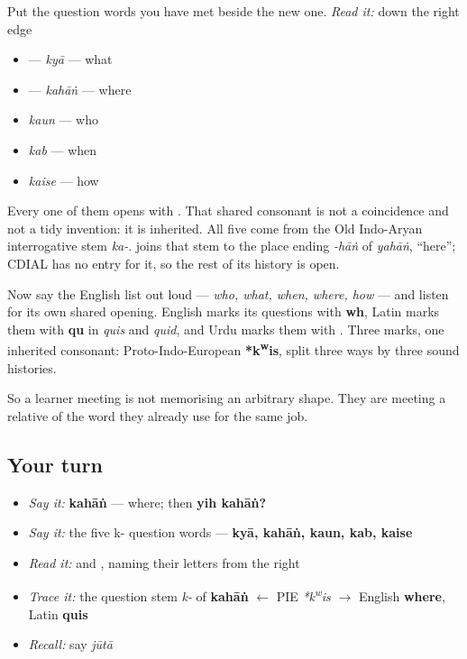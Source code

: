 \begin{cousinweb}
Put the question words you have met beside the new one. \emph{Read it:} down the right edge

\begin{itemize}
\raggedright
  \item \textbf{} — \emph{kyā} — what
  \item \textbf{} — \emph{kahāṅ} — where
  \item \emph{kaun} — who
  \item \emph{kab} — when
  \item \emph{kaise} — how
\end{itemize}

Every one of them opens with \textbf{}. That shared consonant is not a coincidence and not a tidy invention: it is inherited. All five come from the Old Indo-Aryan interrogative stem \emph{ka-}. \textbf{} joins that stem to the place ending \emph{-hāṅ} of \emph{yahāṅ}, \textquotedblleft{}here\textquotedblright{}; CDIAL has no entry for it, so the rest of its history is open.

Now say the English list out loud — \emph{who, what, when, where, how} — and listen for its own shared opening. English marks its questions with \textbf{wh}, Latin marks them with \textbf{qu} in \emph{quis} and \emph{quid}, and Urdu marks them with \textbf{}. Three marks, one inherited consonant: Proto-Indo-European \textbf{*k\textsuperscript{w}is}, split three ways by three sound histories.

So a learner meeting \textbf{} is not memorising an arbitrary shape. They are meeting a relative of the word they already use for the same job.
\end{cousinweb}

\subsection*{Your turn}
\begin{itemize}
\raggedright
  \item \emph{Say it:} \textbf{kahāṅ} — where; then \textbf{yih kahāṅ?}
  \item \emph{Say it:} the five k- question words — \textbf{kyā, kahāṅ, kaun, kab, kaise}
  \item \emph{Read it:}  and , naming their letters from the right
  \item \emph{Trace it:} the question stem \emph{k-} of \textbf{kahāṅ} $\leftarrow$ PIE \emph{*k\textsuperscript{w}is} $\to$ English \textbf{where}, Latin \textbf{quis}
  \item \emph{Recall:} say \emph{jūtā}
\end{itemize}

